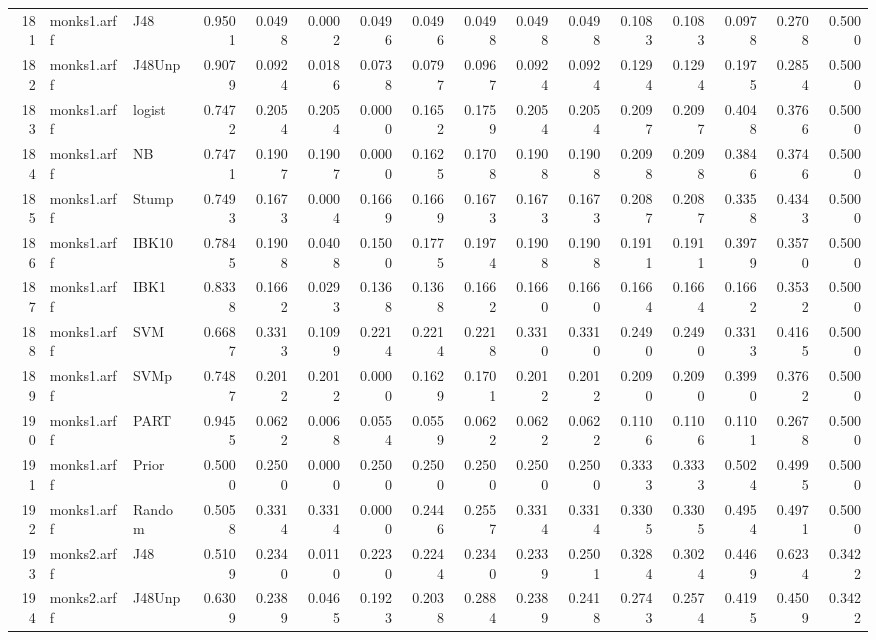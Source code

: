 \documentclass {article}
\begin{document}
\begin{table}[ht]
\begin{tabular}{rllrrrrrrrrrrrrr}
  181 & monks1.arff & J48 & 0.9501 & 0.0498 & 0.0002 & 0.0496 & 0.0496 & 0.0498 & 0.0498 & 0.0498 & 0.1083 & 0.1083 & 0.0978 & 0.2708 & 0.5000 \\ 
  182 & monks1.arff & J48Unp & 0.9079 & 0.0924 & 0.0186 & 0.0738 & 0.0797 & 0.0967 & 0.0924 & 0.0924 & 0.1294 & 0.1294 & 0.1975 & 0.2854 & 0.5000 \\ 
  183 & monks1.arff & logist & 0.7472 & 0.2054 & 0.2054 & 0.0000 & 0.1652 & 0.1759 & 0.2054 & 0.2054 & 0.2097 & 0.2097 & 0.4048 & 0.3766 & 0.5000 \\ 
  184 & monks1.arff & NB & 0.7471 & 0.1907 & 0.1907 & 0.0000 & 0.1625 & 0.1708 & 0.1908 & 0.1908 & 0.2098 & 0.2098 & 0.3846 & 0.3746 & 0.5000 \\ 
  185 & monks1.arff & Stump & 0.7493 & 0.1673 & 0.0004 & 0.1669 & 0.1669 & 0.1673 & 0.1673 & 0.1673 & 0.2087 & 0.2087 & 0.3358 & 0.4343 & 0.5000 \\ 
  186 & monks1.arff & IBK10 & 0.7845 & 0.1908 & 0.0408 & 0.1500 & 0.1775 & 0.1974 & 0.1908 & 0.1908 & 0.1911 & 0.1911 & 0.3979 & 0.3570 & 0.5000 \\ 
  187 & monks1.arff & IBK1 & 0.8338 & 0.1662 & 0.0293 & 0.1368 & 0.1368 & 0.1662 & 0.1660 & 0.1660 & 0.1664 & 0.1664 & 0.1662 & 0.3532 & 0.5000 \\ 
  188 & monks1.arff & SVM & 0.6687 & 0.3313 & 0.1099 & 0.2214 & 0.2214 & 0.2218 & 0.3310 & 0.3310 & 0.2490 & 0.2490 & 0.3313 & 0.4165 & 0.5000 \\ 
  189 & monks1.arff & SVMp & 0.7487 & 0.2012 & 0.2012 & 0.0000 & 0.1629 & 0.1701 & 0.2012 & 0.2012 & 0.2090 & 0.2090 & 0.3990 & 0.3762 & 0.5000 \\ 
  190 & monks1.arff & PART & 0.9455 & 0.0622 & 0.0068 & 0.0554 & 0.0559 & 0.0622 & 0.0622 & 0.0622 & 0.1106 & 0.1106 & 0.1101 & 0.2678 & 0.5000 \\ 
  191 & monks1.arff & Prior & 0.5000 & 0.2500 & 0.0000 & 0.2500 & 0.2500 & 0.2500 & 0.2500 & 0.2500 & 0.3333 & 0.3333 & 0.5024 & 0.4995 & 0.5000 \\ 
  192 & monks1.arff & Random & 0.5058 & 0.3314 & 0.3314 & 0.0000 & 0.2446 & 0.2557 & 0.3314 & 0.3314 & 0.3305 & 0.3305 & 0.4954 & 0.4971 & 0.5000 \\ 
  193 & monks2.arff & J48 & 0.5109 & 0.2340 & 0.0110 & 0.2230 & 0.2244 & 0.2340 & 0.2339 & 0.2501 & 0.3284 & 0.3024 & 0.4469 & 0.6234 & 0.3422 \\ 
  194 & monks2.arff & J48Unp & 0.6309 & 0.2389 & 0.0465 & 0.1923 & 0.2038 & 0.2884 & 0.2389 & 0.2418 & 0.2743 & 0.2574 & 0.4195 & 0.4509 & 0.3422 \\ 

\end{tabular}
\end{table}
\end{document}
